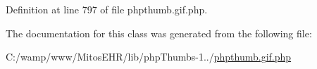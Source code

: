 \-Definition at line 797 of file phpthumb.\-gif.\-php.



\-The documentation for this class was generated from the following file\-:\begin{DoxyCompactItemize}
\item 
\-C\-:/wamp/www/\-Mitos\-E\-H\-R/lib/php\-Thumbs-\/1../\hyperlink{phpthumb_8gif_8php}{phpthumb.\-gif.\-php}\end{DoxyCompactItemize}
